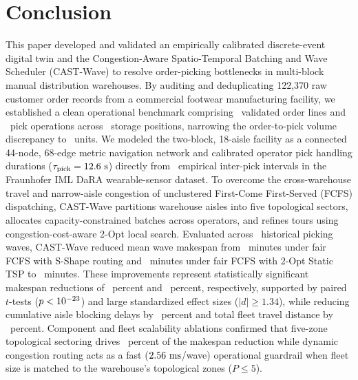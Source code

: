 \documentclass[conference]{IEEEtran}
\begin{document}
\section{Conclusion}
\label{sec:conclusion}
This paper developed and validated an empirically calibrated discrete-event digital twin and the Congestion-Aware Spatio-Temporal Batching and Wave Scheduler (CAST-Wave) to resolve order-picking bottlenecks in multi-block manual distribution warehouses. By auditing and deduplicating 122,370 raw customer order records from a commercial footwear manufacturing facility, we established a clean operational benchmark comprising \TotalOrderLines~validated order lines and \TotalPicks~pick operations across \TotalLocations~storage positions, narrowing the order-to-pick volume discrepancy to \UnitGapReconciled~units. We modeled the two-block, 18-aisle facility as a connected 44-node, 68-edge metric navigation network and calibrated operator pick handling durations ($\tau_{\text{pick}} = 12.6\text{ s}$) directly from \DaRAValidGaps~empirical inter-pick intervals in the Fraunhofer IML DaRA wearable-sensor dataset. To overcome the cross-warehouse travel and narrow-aisle congestion of unclustered First-Come First-Served (FCFS) dispatching, CAST-Wave partitions warehouse aisles into five topological sectors, allocates capacity-constrained batches across operators, and refines tours using congestion-cost-aware 2-Opt local search. Evaluated across \BenchmarkWaves~historical picking waves, CAST-Wave reduced mean wave makespan from \MakespanSShapeMin~minutes under fair FCFS with S-Shape routing and \MakespanTSPMin~minutes under fair FCFS with 2-Opt Static TSP to \MakespanCASTMin~minutes. These improvements represent statistically significant makespan reductions of \MakespanRedSShapePct~percent and \MakespanRedTSPPct~percent, respectively, supported by paired $t$-tests ($p < 10^{-23}$) and large standardized effect sizes ($|d| \ge 1.34$), while reducing cumulative aisle blocking delays by \BlockedTimeReductionPct~percent and total fleet travel distance by \DistanceImprovementVsSShape~percent. Component and fleet scalability ablations confirmed that five-zone topological sectoring drives \SectorShareOfGainPct~percent of the makespan reduction while dynamic congestion routing acts as a fast ($2.56\text{ ms}$/wave) operational guardrail when fleet size is matched to the warehouse's topological zones ($P \le 5$).



\end{document}
